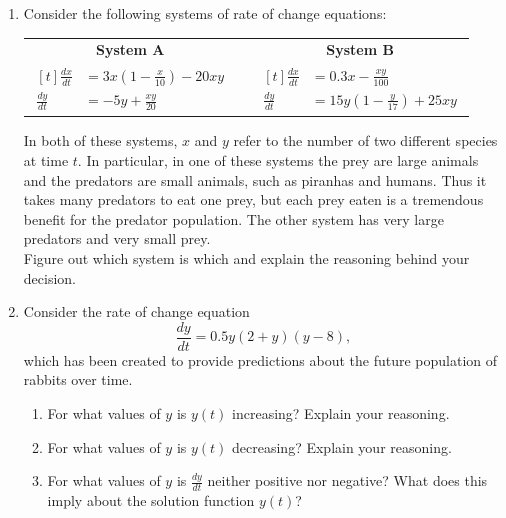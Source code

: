 \begin{enumerate}

\item	Consider the following systems of rate of change equations: \label{01HWproblem1}

\begin{center}
\begin{tabular}{cp{1cm}c}
\textbf{System A}	&& \textbf{System B}  \\

$\displaystyle \begin{aligned}[t]
        \frac{dx}{dt} &= 3x\left(1-\frac{x}{10}\right)-20xy\\
        \frac{dy}{dt} &= -5y+\frac{xy}{20}
        \end{aligned}$	&&				
 $  \displaystyle \begin{aligned}[t]
        \frac{dx}{dt} &= 0.3x -\frac{xy}{100}\\
        \frac{dy}{dt} &= 15y\left(1-\frac{y}{17}\right) +25xy
        \end{aligned}$
\end{tabular}	
\end{center}		 

In both of these systems, $x$ and $y$ refer to the number of two different species at time $t$. In particular, in one of these systems the prey are large animals and the predators are small animals, such as piranhas and humans. Thus it takes many predators to eat one prey, but each prey eaten is a tremendous benefit for the predator population. The other system has very large predators and very small prey. \\

Figure out which system is which and explain the reasoning behind your decision. 

\item Consider the rate of change equation  \[ \frac{dy}{dt}=0.5y(2+y)(y-8),\] which has been created to provide predictions about the future population of rabbits over time.  
\begin{enumerate}
\item	For what values of $y$ is $y(t)$ increasing?  Explain your reasoning.
\item	For what values of $y$ is $y(t)$ decreasing?  Explain your reasoning.
\item	For what values of $y$ is $\displaystyle \frac{dy}{dt}$  neither positive nor negative?  What does this imply about the solution function $y(t)$? \label{01HWproblem2}
\end{enumerate}


\end{enumerate}
